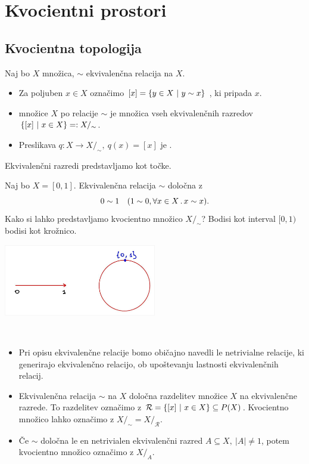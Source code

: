 \section{Kvocientni prostori}
\subsection{Kvocientna topologija}
\begin{definicija}
    Naj bo \(X\) množica, \(\sim\) ekvivalenčna relacija na \(X\). 
    \begin{itemize}
        \item Za poljuben \(x \in X\) označimo \([x] = \left\{y \in X \ | \ y \sim x\right\}\) , ki pripada \(x\).
        \item {} množice \(X\) po relacije \(\sim\) je množica vseh ekvivalenčnih razredov \(\left\{[x] \ | \ x \in X\right\} =: X/_\sim\).
        \item Preslikava \(q: X \to X/_\sim, \ q(x) = [x]\) je .
    \end{itemize}    
\end{definicija}

\begin{opomba}
    Ekvivalenčni razredi predstavljamo kot točke.
\end{opomba}

\begin{primer}
    Naj bo \(X = [0, 1]\). Ekvivalenčna relacija \(\sim\) določna z \[0 \sim 1 \quad (1 \sim 0, \forall x \in X \,.\,x \sim x).\]
    Kako si lahko predstavljamo kvocientno množico \(X/_\sim\)? Bodisi kot interval \([0,1)\) bodisi kot krožnico.
    \begin{center}
        \includegraphics[width=0.5\textwidth]{img/01_001.jpg}      
    \end{center}
\end{primer}

\begin{opomba}
    \
    \begin{itemize}
        \item Pri opisu ekvivalenčne relacije bomo običajno navedli le netrivialne relacije, ki generirajo ekvivalenčno relacijo, ob upoštevanju lastnosti ekvivalenčnih relacij.
        \item Ekvivalenčna relacija \(\sim\) na \(X\) določna razdelitev množice \(X\) na ekvivalenčne razrede. To razdelitev označimo z \(\mathcal{R} = \left\{[x] \ | \ x \in X\right\} \subseteq P(X)\). Kvocientno množico lahko označimo z \(X/_\sim = X/_\mathcal{R}\).
        \item Če \(\sim\) določna le en netrivialen ekvivalenčni razred \(A \subseteq X, \ |A| \neq 1\), potem kvocientno množico označimo z \(X/_A\).
    \end{itemize}
\end{opomba}

